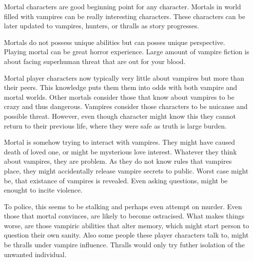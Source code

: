 Mortal characters are good beginning point for any character. 
Mortals in world filled with vampires can be really interesting characters.
These characters can be later updated to vampires, hunters, or thralls as story progresses.

Mortals do not possess unique abilities but can posses unique perspective.
Playing mortal can be great horror experience.
Large amount of vampire fiction is about facing superhuman threat that are out for your blood.

Mortal player characters now typically very little about vampires but more than their peers.
This knowledge puts them them into odds with both vampire and mortal worlds.
Other mortals consider those that know about vampires to be crazy and thus dangerous.
Vampires consider those characters to be nuicanse and possible threat.
However, even though character might know this they cannot return to their previous life, where they were safe as truth is large burden.

Mortal is somehow trying to interact with vampires.
They might have caused death of loved one, or might be mysterious love interest.
Whatever they think about vampires, they are problem.
As they do not know rules that vampires place, they might accidentally release vampire secrets to public.
Worst case might be, that existance of vampires is revealed.
Even asking questions, might be enought to incite violence.

To police, this seems to be stalking and perhaps even attempt on murder.
Even those that mortal convinces, are likely to become ostracised.
What makes things worse, are those vampiric abilities that alter memory, which might start person to question their own sanity.
Also some people these player characters talk to, might be thralls under vampire influence.
Thralls would only try futher isolation of the unwanted individual.


\pagebreak
